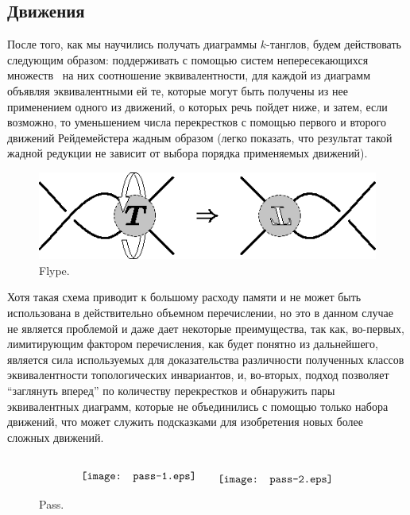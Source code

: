 \documentclass[12pt]{article}
\theoremstyle{plain}
\theoremstyle{definition}
\begin{document}
	\subsection{Движения}

		После того, как мы научились получать диаграммы $k$-танглов, будем действовать следующим образом: поддерживать с помощью
		систем непересекающихся множеств~\cite{CormenLeisersonRivestStein2009, Sedgewick1983} на них соотношение эквивалентности, для
		каждой из диаграмм объявляя эквивалентными ей те, которые могут быть получены из нее применением одного из движений, о которых
		речь пойдет ниже, и затем, если возможно, то уменьшением числа перекрестков с помощью первого и второго движений Рейдемейстера
		жадным образом (легко показать, что результат такой жадной редукции не зависит от выбора порядка применяемых движений).

		\begin{figure}[ht]
			\centering
			\includegraphics{c/flype.eps}
			\caption{\footnotesize Flype.\label{figure:flype}}
		\end{figure}

		Хотя такая схема приводит к большому расходу памяти и не может быть использована в действительно объемном перечислении, но это
		в данном случае не является проблемой и даже дает некоторые преимущества, так как, во-первых, лимитирующим фактором перечисления,
		как будет понятно из дальнейшего, является сила используемых для доказательства различности полученных классов эквивалентности
		топологических инвариантов, и, во-вторых, подход позволяет ``заглянуть вперед'' по количеству перекрестков и обнаружить пары
		эквивалентных диаграмм, которые не объединились с помощью только набора движений, что может служить подсказками для изобретения
		новых более сложных движений.

		\begin{figure}[ht]
			\centering
			$$
			{\raise-4mm\hbox{\protect\texttt{[image: pass-1.eps]}}}
			\qquad
			{\raise-5mm\hbox{\protect\texttt{[image: pass-2.eps]}}}
			$$
			\caption{\footnotesize Pass.\label{figure:pass}}
		\end{figure}
\end{document}

